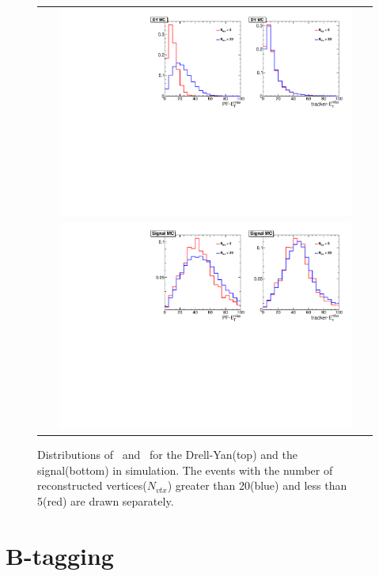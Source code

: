 \begin{figure}[htp] 
\centering 
\begin{tabular}{c} 
\includegraphics[width=0.9\textwidth]{figures/metcomp_dy.pdf} \\
\includegraphics[width=0.9\textwidth]{figures/metcomp_sig.pdf}
\end{tabular} 
\caption{Distributions of \pfmet\ and \trkmet\
for the Drell-Yan(top) and the signal(bottom) in simulation. 
The events with the number of reconstructed vertices($N_{vtx}$) 
greater than 20(blue) and less than 5(red) are drawn separately.}
\label{fig:metcomp} 
\end{figure} 

\section{ B-tagging }
\label{sec:btagging}


